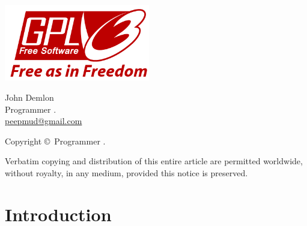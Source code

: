 \maketitle

\thispagestyle{empty}

\vspace{72pt}

\begin{center}
\includegraphics[width=2.5in]{web-logo-full-red.png}
\end{center}

\vspace{72pt}

\begin{center}
\large{John Demlon} \\
\large{Programmer .} \\
\large{\href{mailto:peepmud@gmail.com}{peepmud@gmail.com}} \\
\end{center}

\vspace{72pt}

\begin{center}
Copyright \copyright\ Programmer . \\
\end{center}

\noindent
Verbatim copying and distribution of this entire article are permitted
worldwide, without royalty, in any medium, provided this notice is
preserved.


\newpage

\setlength{\locallinewidth}{\linewidth}

\hypertarget{introduction}{}
\section*{Introduction}

